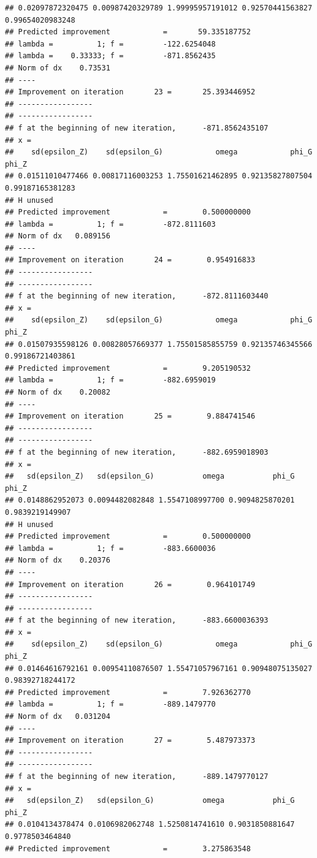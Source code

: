 \documentclass[12pt,a4paper,]{article}
\newcommand{\0}{\mathbf{0}}
\begin{document}
\begin{verbatim}
## 0.02097872320475 0.00987420329789 1.99995957191012 0.92570441563827 0.99654020983248 
## Predicted improvement            =       59.335187752
## lambda =          1; f =         -122.6254048 
## lambda =    0.33333; f =         -871.8562435 
## Norm of dx    0.73531
## ----
## Improvement on iteration       23 =       25.393446952
## -----------------
## -----------------
## f at the beginning of new iteration,      -871.8562435107 
## x =
##    sd(epsilon_Z)    sd(epsilon_G)            omega            phi_G            phi_Z 
## 0.01511010477466 0.00817116003253 1.75501621462895 0.92135827807504 0.99187165381283 
## H unused
## Predicted improvement            =        0.500000000
## lambda =          1; f =         -872.8111603 
## Norm of dx   0.089156
## ----
## Improvement on iteration       24 =        0.954916833
## -----------------
## -----------------
## f at the beginning of new iteration,      -872.8111603440 
## x =
##    sd(epsilon_Z)    sd(epsilon_G)            omega            phi_G            phi_Z 
## 0.01507935598126 0.00828057669377 1.75501585855759 0.92135746345566 0.99186721403861 
## Predicted improvement            =        9.205190532
## lambda =          1; f =         -882.6959019 
## Norm of dx    0.20082
## ----
## Improvement on iteration       25 =        9.884741546
## -----------------
## -----------------
## f at the beginning of new iteration,      -882.6959018903 
## x =
##   sd(epsilon_Z)   sd(epsilon_G)           omega           phi_G           phi_Z 
## 0.0148862952073 0.0094482082848 1.5547108997700 0.9094825870201 0.9839219149907 
## H unused
## Predicted improvement            =        0.500000000
## lambda =          1; f =         -883.6600036 
## Norm of dx    0.20376
## ----
## Improvement on iteration       26 =        0.964101749
## -----------------
## -----------------
## f at the beginning of new iteration,      -883.6600036393 
## x =
##    sd(epsilon_Z)    sd(epsilon_G)            omega            phi_G            phi_Z 
## 0.01464616792161 0.00954110876507 1.55471057967161 0.90948075135027 0.98392718244172 
## Predicted improvement            =        7.926362770
## lambda =          1; f =         -889.1479770 
## Norm of dx   0.031204
## ----
## Improvement on iteration       27 =        5.487973373
## -----------------
## -----------------
## f at the beginning of new iteration,      -889.1479770127 
## x =
##   sd(epsilon_Z)   sd(epsilon_G)           omega           phi_G           phi_Z 
## 0.0104134378474 0.0106982062748 1.5250814741610 0.9031850881647 0.9778503464840 
## Predicted improvement            =        3.275863548

\end{verbatim}
\end{document}
